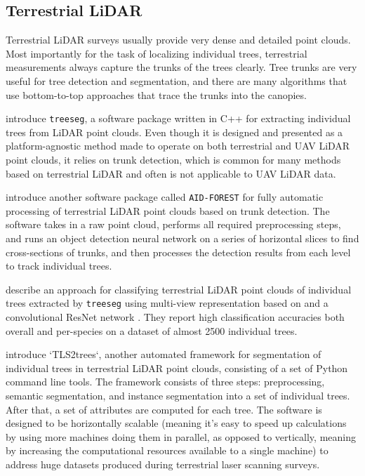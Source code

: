 \subsection{Terrestrial LiDAR}

Terrestrial LiDAR surveys usually provide very dense and detailed point clouds.
Most importantly for the task of localizing individual trees, terrestrial measurements always capture the trunks of the trees clearly.
Tree trunks are very useful for tree detection and segmentation, and there are many algorithms that use bottom-to-top approaches that trace the trunks into the canopies.

\citet{burtExtractingIndividualTrees2018} introduce \texttt{treeseg}, a software package written in C++ for extracting individual trees from LiDAR point clouds.
Even though it is designed and presented as a platform-agnostic method made to operate on both terrestrial and UAV LiDAR point clouds, it relies on trunk detection, which is common for many methods based on terrestrial LiDAR and often is not applicable to UAV LiDAR data.

\citet{lopezserranoArtificialIntelligencebasedSoftware2022} introduce another software package called \texttt{AID-FOREST} for fully automatic processing of terrestrial LiDAR point clouds based on trunk detection.
The software takes in a raw point cloud, performs all required preprocessing steps, and runs an object detection neural network on a series of horizontal slices to find cross-sections of trunks, and then processes the detection results from each level to track individual trees.

\citet{allenTreeSpeciesClassification2022} describe an approach for classifying terrestrial LiDAR point clouds of individual trees extracted by \texttt{treeseg} using multi-view representation based on \citet{goyalRevisitingPointCloud2021} and a convolutional ResNet network \citep{heDeepResidualLearning2016}.
They report high classification accuracies both overall and per-species on a dataset of almost 2500 individual trees.

\citet{wilkesTLS2treesScalableTree2023} introduce `TLS2trees`, another automated framework for segmentation of individual trees in terrestrial LiDAR point clouds, consisting of a set of Python command line tools.
The framework consists of three steps: preprocessing, semantic segmentation, and instance segmentation into a set of individual trees.
After that, a set of attributes are computed for each tree.
The software is designed to be horizontally scalable (meaning it's easy to speed up calculations by using more machines doing them in parallel, as opposed to vertically, meaning by increasing the computational resources available to a single machine) to address huge datasets produced during terrestrial laser scanning surveys.

